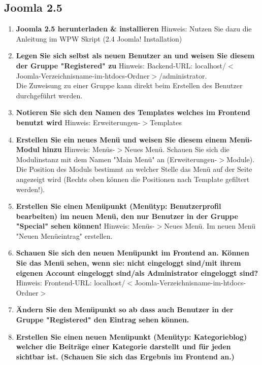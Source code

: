\documentclass[]{article}
\begin{document}
\subsection{Joomla 2.5}
\begin{enumerate}
\item \textbf{Joomla 2.5 herunterladen \& installieren} \newline Hinweis: Nutzen Sie dazu die Anleitung im WPW Skript (2.4 Joomla! Installation)
\item \textbf{Legen Sie sich selbst als neuen Benutzer an und weisen Sie diesem der Gruppe "Registered" zu} \newline
Hinweis: Backend-URL: localhost/$ < $Joomla-Verzeichnisname-im-htdocs-Ordner$ > $/administrator. \\
Die Zuweisung zu einer Gruppe kann direkt beim Erstellen des Benutzer durchgeführt werden.
\item \textbf{Notieren Sie sich den Namen des Templates welches im Frontend benutzt wird} \newline
Hinweis: Erweiterungen-$ > $Templates
\item \textbf{Erstellen Sie ein neues Menü und weisen Sie diesem einem Menü-Modul hinzu} \newline
Hinweis: Menüs-$ > $Neues Menü. Schauen Sie sich die Modulinstanz mit dem Namen "Main Menü" an (Erweiterungen-$>$Module). Die Position des Moduls bestimmt an welcher Stelle das Menü auf der Seite angezeigt wird (Rechts oben können die Positionen nach Template gefiltert werden!).
\item \textbf{Erstellen Sie einen Menüpunkt (Menütyp: Benutzerprofil bearbeiten) im neuen Menü, den nur Benutzer in der Gruppe "Special" sehen können!} \newline
Hinweis: Menüs-$ > $Neues Menü. Im neuen Menü "Neuen Menüeintrag" erstellen.
\item \textbf{Schauen Sie sich den neuen Menüpunkt im Frontend an. Können Sie das Menü sehen, wenn sie: nicht eingeloggt sind/mit ihrem eigenen Account eingeloggt sind/als Administrator eingeloggt sind?} \newline
Hinweis: Frontend-URL: localhost/$ < $Joomla-Verzeichnisname-im-htdocs-Ordner$ > $ 
\item \textbf{Ändern Sie den Menüpunkt so ab dass auch Benutzer in der Gruppe "Registered" den Eintrag sehen können.}
\item \textbf{Erstellen Sie einen neuen Menüpunkt (Menütyp: Kategorieblog) welcher die Beiträge einer Kategorie darstellt und für jeden sichtbar ist. (Schauen Sie sich das Ergebnis im Frontend an.)} \newline

\end{enumerate}
\end{document}
